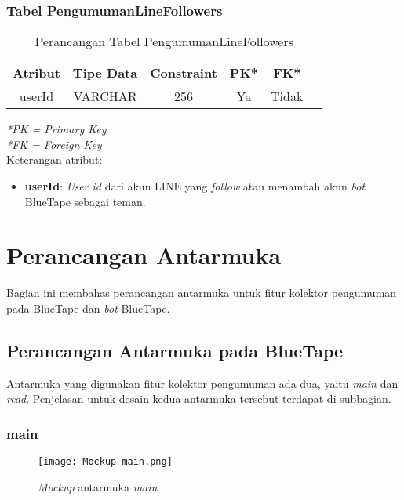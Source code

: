\subsubsection{Tabel PengumumanLineFollowers}
\begin{center}
	\begin{table}[H]
	\caption{Perancangan Tabel PengumumanLineFollowers}
	\begin{tabular}{|c|c|c|c|c|c|}
 			\hline
			\textbf{Atribut} & \textbf{Tipe Data} & \textbf{Constraint} & \textbf{PK*}  & \textbf{FK*} \\
			\hline
			 userId & VARCHAR & 256 & Ya & Tidak\\
            \hline
	\end{tabular}
	\end{table}
\end{center}
\textit{*PK = Primary Key} \\
\textit{*FK = Foreign Key} \\

Keterangan atribut:
\begin{itemize}
\item \textbf{userId}: \textit{User id} dari akun LINE yang \textit{follow} atau menambah akun \textit{bot} BlueTape sebagai teman.
\end{itemize}

\section{Perancangan Antarmuka}
	Bagian ini membahas perancangan antarmuka untuk fitur kolektor pengumuman pada BlueTape dan \textit{bot} BlueTape.
\subsection{Perancangan Antarmuka pada BlueTape}
Antarmuka yang digunakan fitur kolektor pengumuman ada dua, yaitu \textit{main} dan \textit{read}. Penjelasan untuk desain kedua antarmuka tersebut terdapat di subbagian.

\subsubsection{main}

\begin{figure}[H]
	\centering  
	\texttt{[image: Mockup-main.png]}  
	\caption[\textit{Mockup} antarmuka \textit{main}]{\textit{Mockup} antarmuka \textit{main}} 
	\label{fig:mockup-main} 
\end{figure}

